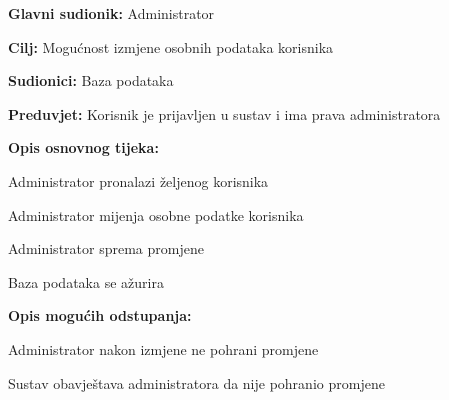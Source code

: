 					\noindent {}
					\begin{packed_item}
						
						\item \textbf{Glavni sudionik: }Administrator
						\item  \textbf{Cilj:} Mogućnost izmjene osobnih podataka korisnika 
						\item  \textbf{Sudionici:} Baza podataka
						\item  \textbf{Preduvjet:} Korisnik je prijavljen u sustav i ima prava administratora
						\item  \textbf{Opis osnovnog tijeka:}
						
						\item[] \begin{packed_enum}
							
							\item Administrator pronalazi željenog korisnika
							\item Administrator mijenja osobne podatke korisnika
							\item Administrator sprema promjene
							\item Baza podataka se ažurira
							
						\end{packed_enum}
						
						\item  \textbf{Opis mogućih odstupanja:}
						
						\item[] \begin{packed_item}
							
							\item[2.a] Administrator nakon izmjene ne pohrani promjene
							\item[] \begin{packed_enum}
								
								\item Sustav obavještava administratora da nije pohranio promjene
								
							\end{packed_enum}
						\end{packed_item}
					\end{packed_item}
					
